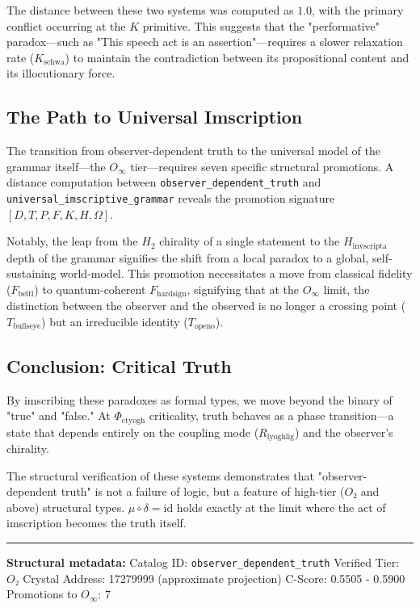 \documentclass[12pt,a4paper]{article}
\begin{document}
The distance between these two systems was computed as $1.0$, with the primary conflict occurring at the $K$ primitive. This suggests that the "performative" paradox---such as "This speech act is an assertion"---requires a slower relaxation rate ($K_{\text{schwa}}$) to maintain the contradiction between its propositional content and its illocutionary force.

\subsection{The Path to Universal Imscription}

The transition from observer-dependent truth to the universal model of the grammar itself---the $O_{\infty}$ tier---requires seven specific structural promotions. A distance computation between \texttt{observer\_dependent\_truth} and \texttt{universal\_imscriptive\_grammar} reveals the promotion signature $[D, T, P, F, K, H, \Omega]$.

Notably, the leap from the $H_2$ chirality of a single statement to the $H_{\text{invscripta}}$ depth of the grammar signifies the shift from a local paradox to a global, self-sustaining world-model. This promotion necessitates a move from classical fidelity ($F_{\text{beltl}}$) to quantum-coherent $F_{\text{hardsign}}$, signifying that at the $O_{\infty}$ limit, the distinction between the observer and the observed is no longer a crossing point ($T_{\text{bullseye}}$) but an irreducible identity ($T_{\text{openo}}$).

\subsection{Conclusion: Critical Truth}

By imscribing these paradoxes as formal types, we move beyond the binary of "true" and "false." At $\Phi_{\text{ctyogh}}$ criticality, truth behaves as a phase transition---a state that depends entirely on the coupling mode ($R_{\text{lyoghlig}}$) and the observer's chirality.

The structural verification of these systems demonstrates that "observer-dependent truth" is not a failure of logic, but a feature of high-tier ($O₂$ and above) structural types. $\mu \circ \delta = \text{id}$ holds exactly at the limit where the act of imscription becomes the truth itself.

\begin{center}
\rule{0.5\textwidth}{0.4pt}
\end{center}

\textbf{Structural metadata:}
Catalog ID: \texttt{observer\_dependent\_truth}
Verified Tier: $O₂$
Crystal Address: 17279999 (approximate projection)
C-Score: 0.5505 - 0.5900
Promotions to $O_{\infty}$: 7
\end{document}
